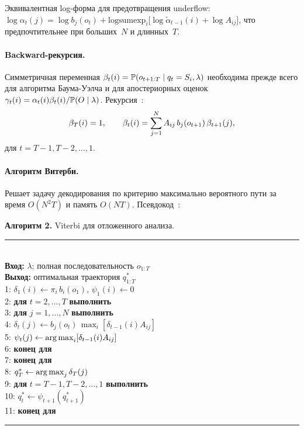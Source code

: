Эквивалентная log-форма для предотвращения underflow:
$\log\alpha_t(j) = \log b_j(o_t) + \mathrm{logsumexp}_i\bigl[
\log\tilde\alpha_{t-1}(i) + \log A_{ij}\bigr]$, что предпочтительнее
при больших~$N$ и длинных~$T$.

\paragraph*{Backward-рекурсия.} Симметричная переменная
$\beta_t(i)=\mathbb{P}(o_{t+1:T}\mid q_t=S_i,\lambda)$ необходима
прежде всего для алгоритма Баума-Уэлча и для апостериорных
оценок $\gamma_t(i) = \alpha_t(i)\beta_t(i) / \mathbb{P}(O\mid\lambda)$.
Рекурсия~\cite[уравн.~24--25]{Rabiner1989}:
\begin{equation}
\beta_T(i) = 1, \qquad
\beta_t(i) = \sum_{j=1}^N A_{ij}\,b_j(o_{t+1})\,\beta_{t+1}(j),
\eqlab{backward-app}
\end{equation}
для $t=T-1,T-2,\dots,1$.

\paragraph*{Алгоритм Витерби.} Решает задачу декодирования по
критерию максимально вероятного пути за время $O(N^2 T)$ и
память $O(NT)$. Псевдокод~\cite[уравн.~32--35]{Rabiner1989}:

\par\addvspace{2pt}
{\centering
\begin{minipage}{0.97\linewidth}
\footnotesize
\textbf{Алгоритм 2.} Viterbi для отложенного анализа. \\[1pt]
\rule{\linewidth}{0.4pt}\vspace{1pt}\\
\textbf{Вход:} $\lambda$; полная последовательность $o_{1:T}$ \\
\textbf{Выход:} оптимальная траектория $q^*_{1:T}$ \\
1: $\delta_1(i) \gets \pi_i\,b_i(o_1)$, $\psi_1(i) \gets 0$ \\
2: \textbf{для} $t = 2,\dots,T$ \textbf{выполнить} \\
3: \quad \textbf{для} $j=1,\dots,N$ \textbf{выполнить} \\
4: \quad\quad $\delta_t(j) \gets b_j(o_t)\,\max_i [\delta_{t-1}(i)A_{ij}]$ \\
5: \quad\quad $\psi_t(j) \gets \operatorname*{arg\,max}_i [\delta_{t-1}(i)A_{ij}]$ \\
6: \quad \textbf{конец для} \\
7: \textbf{конец для} \\
8: $q^*_T \gets \operatorname*{arg\,max}_j \delta_T(j)$ \\
9: \textbf{для} $t = T-1, T-2,\dots,1$ \textbf{выполнить} \\
10: \quad $q^*_t \gets \psi_{t+1}(q^*_{t+1})$ \\
11: \textbf{конец для} \\
\rule{\linewidth}{0.4pt}
\end{minipage}\par}
\addvspace{4pt}

